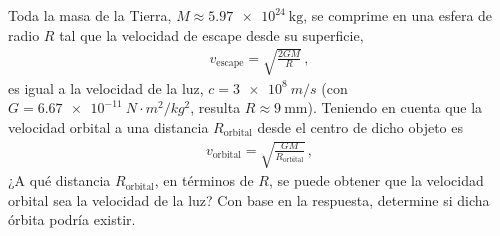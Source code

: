 \documentclass[12pt, a4paper]{article}
\begin{document}
\begin{exercise}[ID=escape-orbital, subtitle={Órbita a la velocidad de la luz}, tags={banco}]
Toda la masa de la Tierra, $M\approx \qty{5.97e24}{\kilo\g}$, se comprime en una esfera de radio $R$ tal que la velocidad de escape desde su superficie,
\begin{align*}
    v_{\text{escape}} = \sqrt{\frac{2 G M}{R}}\,,
\end{align*}
es igual a la velocidad de la luz, $c=\qty{3e8}{m/s}$ (con $G=\qty{6.67e-11}{{N\cdot m^2}/{kg^2}}$, resulta $R\approx\qty{9}{\mm}$). Teniendo en cuenta que la velocidad orbital a una distancia $R_{\text{orbital}}$ desde el centro de dicho objeto es
\begin{align*}
    v_{\text{orbital}} = \sqrt{\frac{G M}{R_{\text{orbital}}}}\,,
\end{align*}
¿A qué distancia $R_{\text{orbital}}$, en términos de $R$, se puede obtener que la velocidad orbital sea la velocidad de la luz? Con base en la respuesta, determine si dicha órbita podría existir.
\end{exercise}
\end{document}
